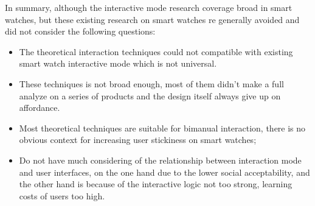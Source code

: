 In summary, although the interactive mode research coverage broad in smart watches, but these existing research on smart watches re generally avoided and did not consider the following questions:
\begin{itemize}
    \kaishu
    \item The theoretical interaction techniques could not compatible with existing smart watch interactive mode which is not universal.
    \item These techniques is not broad enough, most of them didn't make a full analyze on a series of products and the design itself always give up on affordance.
    \item Most theoretical techniques are suitable for bimanual interaction, there is no obvious context for increasing user stickiness on smart watches;
    \item Do not have much considering of the relationship between interaction mode and user interfaces, on the one hand due to the lower social acceptability, and the other hand is because of the interactive logic not too strong, learning costs of users too high.
\end{itemize}

\cleardoublepage
